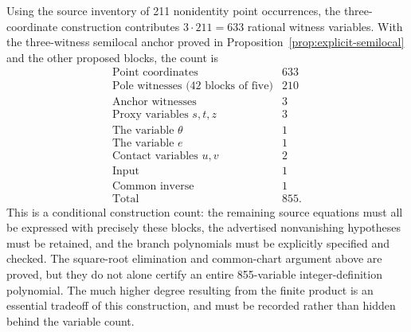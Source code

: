 Using the source inventory of 211 nonidentity point occurrences, the
three-coordinate construction contributes $3\cdot211=633$ rational
witness variables.  With the three-witness semilocal anchor proved in
Proposition~\ref{prop:explicit-semilocal} and the other proposed blocks,
the count is
\[
\begin{array}{lr}
\text{Point coordinates} &633\\
\text{Pole witnesses (42 blocks of five)}&210\\
\text{Anchor witnesses}&3\\
\text{Proxy variables }s,t,z&3\\
\text{The variable }\theta&1\\
\text{The variable }e&1\\
\text{Contact variables }u,v&2\\
\text{Input}&1\\
\text{Common inverse}&1\\\hline
\text{Total}&855.
\end{array}
\]
This is a conditional construction count: the remaining source equations
must all be expressed with precisely these blocks, the advertised
nonvanishing hypotheses must be retained, and the branch polynomials
must be explicitly specified and checked.  The square-root elimination
and common-chart argument above are proved, but they do not alone
certify an entire 855-variable integer-definition polynomial.
The much higher degree resulting from the finite product is an
essential tradeoff of this construction, and must be recorded rather
than hidden behind the variable count.
